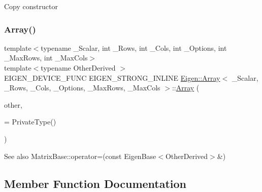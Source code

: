 Copy constructor \mbox{\label{class_eigen_1_1_array_a7a08ebcc8bef6c9df21becd525792240}} 
\subsubsection{\texorpdfstring{Array()}{Array()}\hspace{0.1cm}{\footnotesize\ttfamily [5/5]}}
{\footnotesize\ttfamily template$<$typename \+\_\+\+Scalar, int \+\_\+\+Rows, int \+\_\+\+Cols, int \+\_\+\+Options, int \+\_\+\+Max\+Rows, int \+\_\+\+Max\+Cols$>$ \\
template$<$typename Other\+Derived $>$ \\
E\+I\+G\+E\+N\+\_\+\+D\+E\+V\+I\+C\+E\+\_\+\+F\+U\+NC E\+I\+G\+E\+N\+\_\+\+S\+T\+R\+O\+N\+G\+\_\+\+I\+N\+L\+I\+NE \mbox{\hyperlink{class_eigen_1_1_array}{Eigen\+::\+Array}}$<$ \+\_\+\+Scalar, \+\_\+\+Rows, \+\_\+\+Cols, \+\_\+\+Options, \+\_\+\+Max\+Rows, \+\_\+\+Max\+Cols $>$\+::\mbox{\hyperlink{class_eigen_1_1_array}{Array}} (\begin{DoxyParamCaption}\item[{const \mbox{\hyperlink{struct_eigen_1_1_eigen_base}{Eigen\+Base}}$<$ Other\+Derived $>$ \&}]{other,  }\item[{typename \mbox{\hyperlink{struct_eigen_1_1internal_1_1enable__if}{internal\+::enable\+\_\+if}}$<$ \mbox{\hyperlink{struct_eigen_1_1internal_1_1is__convertible}{internal\+::is\+\_\+convertible}}$<$ typename Other\+Derived\+::\+Scalar, Scalar $>$\+::value, Private\+Type $>$\+::type}]{ = {\ttfamily PrivateType()} }\end{DoxyParamCaption})\hspace{0.3cm}{\ttfamily [inline]}}

\begin{DoxySeeAlso}{See also}
Matrix\+Base\+::operator=(const Eigen\+Base$<$\+Other\+Derived$>$\&) 
\end{DoxySeeAlso}


\subsection{Member Function Documentation}
\mbox{\label{class_eigen_1_1_array_afbfc12954f16d21aedb7bd839f64a278}} 
